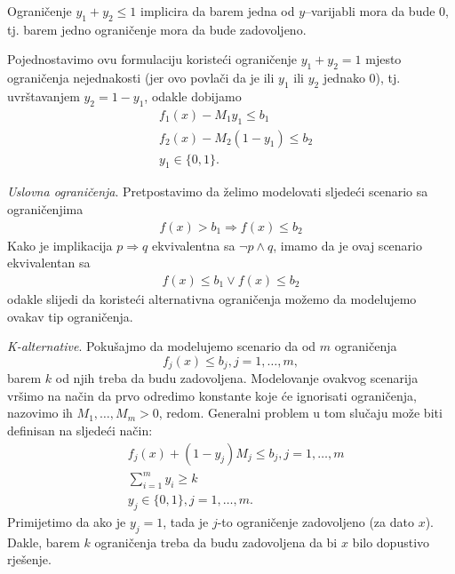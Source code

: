 \documentclass[a4paper, utf8, 11pt, colorlinks]{book}
\begin{document}
Ograničenje $y_1 + y_2 \leq 1$ implicira da barem jedna od $y$--varijabli mora da bude 0, tj. barem jedno ograničenje mora da bude zadovoljeno. 

Pojednostavimo ovu formulaciju koristeći ograničenje $y_1 + y_2 = 1$ mjesto ograničenja nejednakosti (jer ovo povlači da je ili $y_1$ ili $y_2$    jednako 0), tj. uvrštavanjem $y_2 =  1-y_1$, odakle dobijamo 
\begin{align*}
      & f_1(x) - M_1 y_1       \leq b_1 \\
      & f_2(x) - M_2 (1-y_1)   \leq b_2  \\
      & y_1 \in \{0,1 \}.
\end{align*}

\emph{Uslovna ograničenja}. 
Pretpostavimo da želimo modelovati sljedeći scenario sa ograničenjima 
\begin{align*}
    f(x) > b_1 \Rightarrow f(x) \leq b_2 
\end{align*}
Kako je implikacija $p \Rightarrow q$ ekvivalentna sa $\neg p \wedge q$, imamo da je ovaj scenario  ekvivalentan sa
\begin{align*}
    f(x) \leq b_1 \vee f(x) \leq b_2 
\end{align*}
odakle slijedi da koristeći alternativna ograničenja možemo da modelujemo ovakav tip ograničenja.

\emph{K-alternative}. Pokušajmo da modelujemo scenario da od $m$ ograničenja
$$f_j(x) \leq  b_j, j=1,\ldots,m,$$
barem $k$ od njih treba da budu zadovoljena. Modelovanje ovakvog scenarija vršimo na način da prvo odredimo konstante koje će ignorisati ograničenja, nazovimo ih $M_1, \ldots, M_m>0$, redom. Generalni problem u tom slučaju može biti definisan na sljedeći način:
\begin{align}
     &f_j(x) + (1-y_j) M_j \leq b_j, j=1,\ldots,m\\
     & \sum_{i=1}^m y_i \geq k \\
     & y_j \in \{0,1\}, j=1,\ldots,m.
\end{align}
Primijetimo da ako je $y_j = 1$, tada je $j$-to ograničenje zadovoljeno (za dato $x$). Dakle, barem $k$ ograničenja treba da budu zadovoljena da bi $x$ bilo dopustivo rješenje. 
\end{document}
